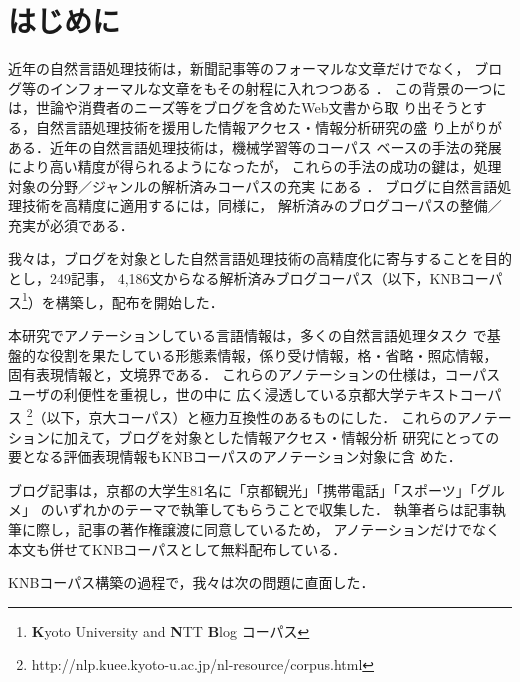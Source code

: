 \documentclass[japanese]{jnlp_JS2.0}
\begin{document}
\maketitle


\section{はじめに}

近年の自然言語処理技術は，新聞記事等のフォーマルな文章だけでなく，
ブログ等のインフォーマルな文章をもその射程に入れつつある
\cite{ICWSM:2008,ICWSM:2009}．
この背景の一つには，世論や消費者のニーズ等をブログを含めたWeb文書から取
り出そうとする，自然言語処理技術を援用した情報アクセス・情報分析研究の盛
り上がりがある\cite{Sriphaew:Takamura:Okumura:2009,Akamine:Kawahara:Kato:Nakagawa:Inui:Kurohashi:Kidawara:2009,Murakami:Masuda:Matsuyoshi:Nichols:Inui:Matsumoto:2009}．近年の自然言語処理技術は，機械学習等のコーパス
ベースの手法の発展により高い精度が得られるようになったが，
これらの手法の成功の鍵は，処理対象の分野／ジャンルの解析済みコーパスの充実
にある
\cite{McClosky:Charniak:Johnson:2006}．
ブログに自然言語処理技術を高精度に適用するには，同様に，
解析済みのブログコーパスの整備／充実が必須である．

我々は，ブログを対象とした自然言語処理技術の高精度化に寄与することを目的
とし，249記事，
4,186文からなる解析済みブログコーパス（以下，KNBコーパス\footnote{
\textbf{K}yoto University and \textbf{N}TT \textbf{B}log コーパス
}）を構築し，配布を開始した．

本研究でアノテーションしている言語情報は，多くの自然言語処理タスク
で基盤的な役割を果たしている形態素情報，係り受け情報，格・省略・照応情報，
固有表現情報と，文境界である．
これらのアノテーションの仕様は，コーパスユーザの利便性を重視し，世の中に
広く浸透している京都大学テキストコーパス
\cite{Kawahara:Kurohashi:Hashida:2002j}\footnote{http://nlp.kuee.kyoto-u.ac.jp/nl-resource/corpus.html}（以下，京大コーパス）と極力互換性のあるものにした．
これらのアノテーションに加えて，ブログを対象とした情報アクセス・情報分析
研究にとっての要となる評価表現情報もKNBコーパスのアノテーション対象に含
めた．

ブログ記事は，京都の大学生81名に「京都観光」「携帯電話」「スポーツ」「グルメ」
のいずれかのテーマで執筆してもらうことで収集した．
執筆者らは記事執筆に際し，記事の著作権譲渡に同意しているため，
アノテーションだけでなく本文も併せてKNBコーパスとして無料配布している．

KNBコーパス構築の過程で，我々は次の問題に直面した．
\end{document}
